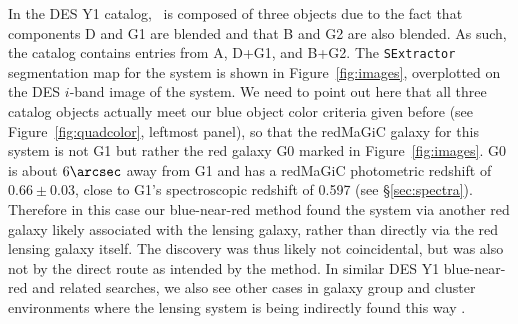 \documentclass[twocolumn]{aastex6}
\begin{document}
\begin{figure*}[ht!]
\caption{DES $gri$ color composite discovery image (top left),
{\tt SExtractor} segmentation map plotted over the
DES $i$-band coadded image (bottom left), 
Gemini $i$-band acquisition image (top right), and the
spectroscopic slit layout (bottom right).
The central red lensing galaxy is G1, 
the three blue lensed quasar images are A, B, and D,
a fourth red image is G2, and the redMaGiC galaxy is G0.
The 5 components (A,B,D,G1,G2) of the system are not fully 
separated in the DES catalog, with D+G1 and B+G2 remaining blended.
\label{fig:images}}
\end{figure*}





In the DES Y1 catalog, \sysname\ is composed of three objects due to the
fact that components D and G1 are blended and that B and G2 are also blended. 
As such, the catalog contains entries from  A, D+G1, and B+G2. 
The {\tt SExtractor} segmentation map for the system is shown in 
Figure~\ref{fig:images}, overplotted on the DES $i$-band image of the system. 
We need to point out here that all three catalog objects actually 
meet our blue object color criteria given before 
(see Figure~\ref{fig:quadcolor}, leftmost panel), 
so that the redMaGiC galaxy for this system is 
not G1 but rather the red galaxy G0 marked in Figure~\ref{fig:images}.
G0 is about $6\arcsec$ away from G1 and has a redMaGiC photometric redshift
of $0.66 \pm 0.03$, close to G1's spectroscopic redshift of 0.597 (see
\S\ref{sec:spectra}).
Therefore in this case our blue-near-red method found the system via 
another red galaxy likely associated with the lensing galaxy, rather than 
directly via the red lensing galaxy itself. 
The discovery was thus likely not coincidental, but was also not by the direct
route as intended by the method.  
In similar DES Y1 blue-near-red and related searches,
we also see
other cases in galaxy group and cluster environments where the lensing 
system is being indirectly found this way \citep[][in preparation]{diehl17}.
\end{document}
